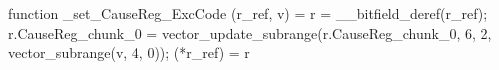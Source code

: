 function _set_CauseReg_ExcCode (r_ref, v) = {
    r = __bitfield_deref(r_ref);
    r.CauseReg_chunk_0 = vector_update_subrange(r.CauseReg_chunk_0, 6, 2, vector_subrange(v, 4, 0));
    (*r_ref) = r
}

